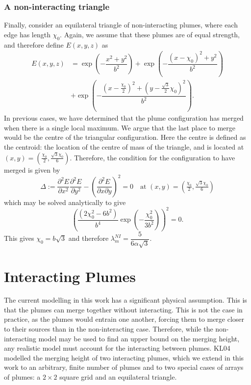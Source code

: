\documentclass{jfm}
\newcommand{\pdbyd}[3]{\dfrac{\partial^2 #1}{\partial #2 \partial #3}} %
\newcommand{\partialSq}[2]{\dfrac{\partial^2 #1}{\partial #2^2}} %
\begin{document}
	\subsubsection{A non-interacting triangle}
	Finally, consider an equilateral triangle of non-interacting plumes, where each edge has length $\chi_0$. Again, we assume that these plumes are of equal strength, and therefore define $E(x,y,z)$ as
	\begin{equation}
		\begin{split}
		E(x,y,z) &= \exp\left(-\dfrac{x^2 + y^2}{b^2}\right) + \exp\left(-\dfrac{(x - \chi_0)^2 + y^2}{b^2}\right) \\
		&+  \exp\left(-\dfrac{\left(x - \tfrac{\chi_0}{2}\right)^2 + \left(y - \tfrac{\sqrt{3}}{2}\chi_0\right)^2}{b^2}\right).\label{eqn:non-interacting triangle E}
		\end{split}
	\end{equation}
	In previous cases, we have determined that the plume configuration has merged when there is a single local maximum. We argue that the last place to merge would be the centre of the triangular configuration. Here the centre is defined as the centroid: the location of the centre of mass of the triangle, and is located at $(x,y) = \left( \tfrac{\chi_0}{2}, \tfrac{\sqrt{3}\chi_0}{6}\right)$. Therefore, the condition for the configuration to have merged is given by
	\begin{equation}
	\Delta := \partialSq{E}{x}\partialSq{E}{y} - \left(\pdbyd{E}{x}{y}\right)^2 = 0 \quad \text{at $(x,y) = \left(\tfrac{\chi_0}{2}, \tfrac{\sqrt{3}\chi_0}{6}\right)$} \label{eqn:triangleHessian}
	\end{equation}
	which may be solved analytically to give
	\begin{equation}
	\left(\dfrac{(2\chi_0^2 - 6b^2)}{b^4}\exp\left(- \dfrac{\chi_0^2}{3b^2}\right)\right)^2 = 0 \label{eqn:nonInteractinganalyticTriangularMerge}.
	\end{equation}
	This gives $\chi_0 = b\sqrt{3}$ and therefore $\lambda_m^{NI} = \dfrac{5}{6\alpha\sqrt{3}}$.
	\section{Interacting Plumes}\label{sec:Interacting Plumes}
	The current modelling in this work has a significant physical assumption. This is that the plumes can merge together without interacting. This is not the case in practice, as the plumes would entrain one another, forcing them to merge closer to their sources than in the non-interacting case. Therefore, while the non-interacting model may be used to find an upper bound on the merging height, any realistic model must account for the interacting between plumes. KL04 modelled the merging height of two interacting plumes, which we extend in this work to an arbitrary, finite number of plumes and to two special cases of arrays of plumes: a $2 \times 2$ square grid and an equilateral triangle.
	
\end{document}
